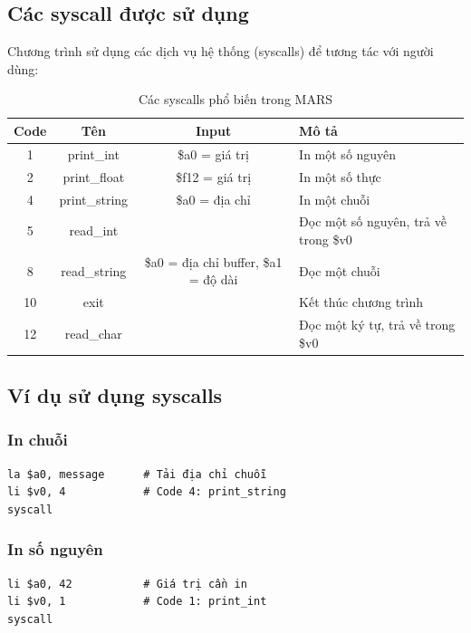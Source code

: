\subsection{Các syscall được sử dụng}

Chương trình sử dụng các dịch vụ hệ thống (syscalls) để tương tác với người dùng:

\begin{table}[H]
\centering
\begin{tabular}{|c|c|c|l|}
\hline
\textbf{Code} & \textbf{Tên} & \textbf{Input} & \textbf{Mô tả} \\
\hline
1 & print\_int & \$a0 = giá trị & In một số nguyên \\
\hline
2 & print\_float & \$f12 = giá trị & In một số thực \\
\hline
4 & print\_string & \$a0 = địa chỉ & In một chuỗi \\
\hline
5 & read\_int &  & Đọc một số nguyên, trả về trong \$v0 \\
\hline
8 & read\_string & \$a0 = địa chỉ buffer, \$a1 = độ dài & Đọc một chuỗi \\
\hline
10 & exit &  & Kết thúc chương trình \\
\hline
12 & read\_char &  & Đọc một ký tự, trả về trong \$v0 \\
\hline
\end{tabular}
\caption{Các syscalls phổ biến trong MARS}
\end{table}

\subsection{Ví dụ sử dụng syscalls}

\subsubsection{In chuỗi}

\begin{verbatim}
la $a0, message      # Tải địa chỉ chuỗi
li $v0, 4            # Code 4: print_string
syscall
\end{verbatim}

\subsubsection{In số nguyên}

\begin{verbatim}
li $a0, 42           # Giá trị cần in
li $v0, 1            # Code 1: print_int
syscall
\end{verbatim}

